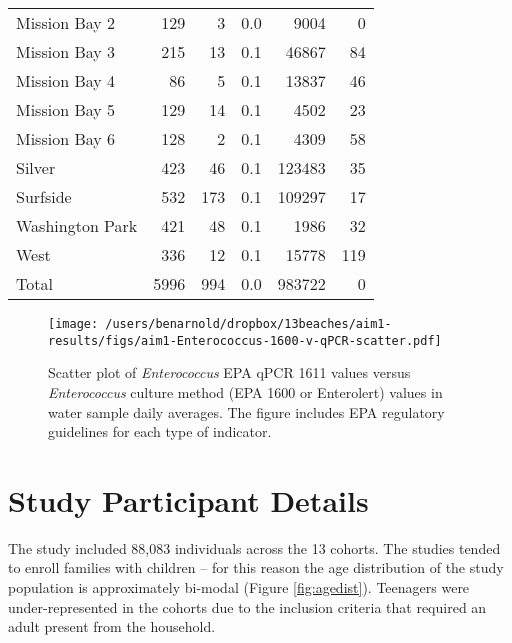 \documentclass[12pt]{article}\usepackage[]{graphicx}\usepackage[]{color}
\begin{document}
\begin{table}[h!tb]
\begin{center}
\begin{tabular}{l rrrrr}
  Mission Bay 2 & 129 & 3 & 0.0 & 9004 & 0 \\ 
  Mission Bay 3 & 215 & 13 & 0.1 & 46867 & 84 \\ 
  Mission Bay 4 & 86 & 5 & 0.1 & 13837 & 46 \\ 
  Mission Bay 5 & 129 & 14 & 0.1 & 4502 & 23 \\ 
  Mission Bay 6 & 128 & 2 & 0.1 & 4309 & 58 \\ 
  Silver & 423 & 46 & 0.1 & 123483 & 35 \\ 
  Surfside & 532 & 173 & 0.1 & 109297 & 17 \\ 
  Washington Park & 421 & 48 & 0.1 & 1986 & 32 \\ 
  West & 336 & 12 & 0.1 & 15778 & 119 \\ 
  
\hline
 Total & 5996 & 994 & 0.0 & 983722 & 0 \\ 
  
\hline
\end{tabular}
\end{center}
\end{table}



\clearpage
\begin{figure}
\begin{center}
\texttt{[image: /users/benarnold/dropbox/13beaches/aim1-results/figs/aim1-Enterococcus-1600-v-qPCR-scatter.pdf]}
\caption{Scatter plot of \emph{Enterococcus} EPA qPCR 1611 values versus \emph{Enterococcus} culture method (EPA 1600 or Enterolert) values in water sample daily averages. The figure includes EPA regulatory guidelines for each type of indicator.
 \label{fig:entero1600v1611}}
\end{center}
\end{figure}

\clearpage
\section{Study Participant Details}

The study included 88,083 individuals across the 13 cohorts. The studies tended to enroll families with children  -- for this reason the age distribution of the study population is approximately bi-modal (Figure \ref{fig:agedist}). Teenagers were under-represented in the cohorts due to the inclusion criteria that required an adult present from the household. 
\end{document}
